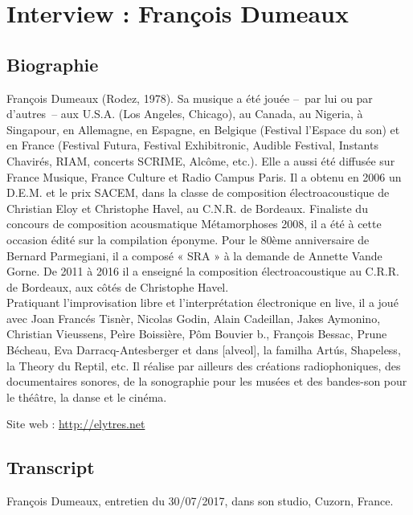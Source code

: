 \chapter{Interview : François Dumeaux}
\label{appendix:dumeaux}

\section*{Biographie}
\noindent François Dumeaux (Rodez, 1978). Sa musique a été jouée --~par lui ou par d’autres~-- aux U.S.A. (Los Angeles, Chicago), au Canada, au Nigeria, à Singapour, en Allemagne, en Espagne, en Belgique (Festival l’Espace du son) et en France (Festival Futura, Festival Exhibitronic, Audible Festival, Instants Chavirés, RIAM, concerts SCRIME, Alcôme, etc.).
 Elle a aussi été diffusée sur France Musique, France Culture et Radio Campus Paris. Il a obtenu en 2006 un D.E.M. et le prix SACEM, dans la classe de composition électroacoustique de Christian Eloy et Christophe Havel, au C.N.R. de Bordeaux. Finaliste du concours de composition acousmatique Métamorphoses 2008, il a été à cette occasion édité sur la compilation éponyme. Pour le 80ème anniversaire de Bernard Parmegiani, il a composé « SRA » à la demande de Annette Vande Gorne. De 2011 à 2016 il a enseigné la composition électroacoustique au C.R.R. de Bordeaux, aux côtés de Christophe Havel.\\
 \indent Pratiquant l’improvisation libre et l’interprétation électronique en live, il a joué avec Joan Francés Tisnèr, Nicolas Godin, Alain Cadeillan, Jakes Aymonino, Christian Vieussens, Peìre Boissière, Pôm Bouvier b., François Bessac, Prune Bécheau, Eva Darracq-Antesberger et dans [alveol], la familha Artús, Shapeless, la Theory du Reptil, etc. Il réalise par ailleurs des créations radiophoniques, des documentaires sonores, de la sonographie pour les musées et des bandes-son pour le théâtre, la danse et le cinéma.

\noindent Site web : \url{http://elytres.net}

\section*{Transcript}

\noindent François Dumeaux, entretien du 30/07/2017, dans son studio, Cuzorn, France.





